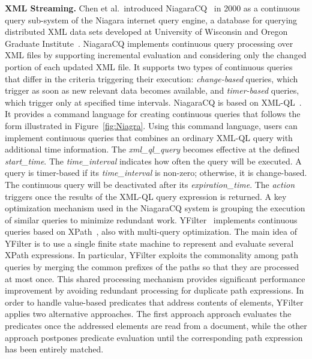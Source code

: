 \textbf{XML Streaming.}
Chen et al.\ introduced NiagaraCQ~\cite{chen_et_al_2000} in 2000 as a
continuous query sub-system of the Niagara internet query engine, a
data\-base for querying distributed XML data sets developed at
University of Wisconsin and Oregon Graduate
Institute~\cite{naughton2001niagara}. NiagaraCQ implements continuous
query processing over XML files by supporting incremental evaluation
and considering only the changed portion of each updated XML file. It
supports two types of continuous queries that differ in the criteria
triggering their execution: \emph{change-based} queries, which trigger
as soon as new relevant data becomes available, and \emph{timer-based}
queries, which trigger only at specified time intervals.  NiagaraCQ is
based on XML-QL~\cite{deutsch1999query}.  It provides a command
language for creating continuous queries that follows the form
illustrated in Figure~\ref{fig:Niagra}. Using this command language,
users can implement continuous queries that combines an ordinary
XML-QL query with additional time information.  The
\textsf{\small\textit{xml\_ql\_query}} becomes effective at the
defined \textsf{\small\textit{start\_time}}.  The
\textsf{\small\textit{time\_interval}} indicates how often the query
will be executed. A query is timer-based if its
\textsf{\small\textit{time\_interval}} is non-zero; otherwise, it is
change-based.  The continuous query will be deactivated after its
\textsf{\small\textit{expiration\_time}}. The
\textsf{\small\textit{action}} triggers once the results of the XML-QL
query expression is returned.  A key optimization mechanism used in
the NiagaraCQ system is grouping the execution of similar queries to
minimize redundant work.  YFilter~\cite{diao_et_al_2002,diao2003high} implements
continuous queries based on XPath~\cite{clark_derose_1999}, also with
multi-query optimization. The main idea of YFilter is to use a single
finite state machine to represent and evaluate several XPath
expressions. In particular, YFilter exploits the commonality among path queries by merging the common prefixes
of the paths so that they are processed at most once. This  shared processing mechanism provides significant performance
improvement by avoiding redundant processing for duplicate path expressions. In order to handle value-based predicates that address contents of elements, YFilter applies two alternative approaches. The first approach approach evaluates the  predicates once the addressed elements are read from a document, while the other approach postpones predicate evaluation until the corresponding path expression has been entirely matched.


